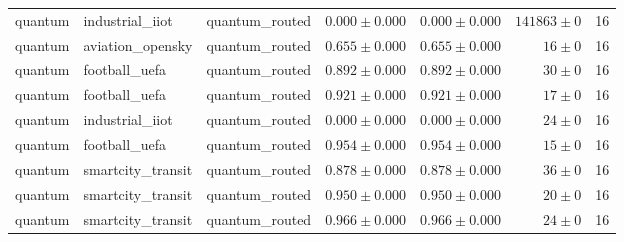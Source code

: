 \begin{table}[htbp]
\begin{tabular}{l l l r r r r}
quantum & industrial\_iiot & quantum\_routed & $0.000\pm0.000$ & $0.000\pm0.000$ & $141863\pm0$ & 16 \\
quantum & aviation\_opensky & quantum\_routed & $0.655\pm0.000$ & $0.655\pm0.000$ & $16\pm0$ & 16 \\
quantum & football\_uefa & quantum\_routed & $0.892\pm0.000$ & $0.892\pm0.000$ & $30\pm0$ & 16 \\
quantum & football\_uefa & quantum\_routed & $0.921\pm0.000$ & $0.921\pm0.000$ & $17\pm0$ & 16 \\
quantum & industrial\_iiot & quantum\_routed & $0.000\pm0.000$ & $0.000\pm0.000$ & $24\pm0$ & 16 \\
quantum & football\_uefa & quantum\_routed & $0.954\pm0.000$ & $0.954\pm0.000$ & $15\pm0$ & 16 \\
quantum & smartcity\_transit & quantum\_routed & $0.878\pm0.000$ & $0.878\pm0.000$ & $36\pm0$ & 16 \\
quantum & smartcity\_transit & quantum\_routed & $0.950\pm0.000$ & $0.950\pm0.000$ & $20\pm0$ & 16 \\
quantum & smartcity\_transit & quantum\_routed & $0.966\pm0.000$ & $0.966\pm0.000$ & $24\pm0$ & 16 \\
\hline
\end{tabular}
\end{table}
